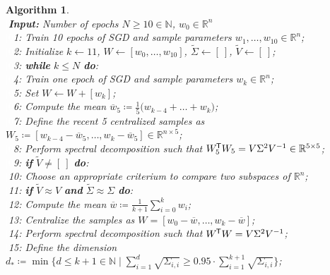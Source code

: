 \documentclass[11pt, a4paper]{article}
\newtheorem{algorithm}[theorem]{Algorithm}
\newcommand{\N}{\mathbb{N}}
\newcommand{\R}{\mathbb{R}}
\newcommand*{\tr}{^{\mkern-1.5mu\mathsf{T}}}
\begin{document}
\begin{algorithm}
\caption{ Sketch of Future Algorithm \textcolor{white}{$\Big |$}} \ \\
\textcolor{white}{$\Big |$}\textbf{Input:} Number of epochs $N \geq 10 \in \N$, $w_0 \in \R^n$ \\
\textcolor{white}{$\Big |0$}1: Train 10 epochs of SGD and sample parameters $w_1, \dots, w_{10} \in \R^n$; \\
\textcolor{white}{$\Big |0$}2: Initialize $k \leftarrow 11$, $W \leftarrow [ w_0, \dots, w_{10} ]$, $\tilde{\Sigma} \leftarrow [ \ ]$, $\tilde{V} \leftarrow [ \ ]$; \\
\textcolor{white}{$\Big |0$}3: \textbf{while} $k\leq N$ \textbf{do}: \\
\textcolor{white}{$\Big |0$}4: \quad Train one epoch of SGD and sample parameters $w_k \in \R^n$; \\
\textcolor{white}{$\Big |0$}5: \quad Set $W \leftarrow W + [w_k]$; \\
\textcolor{white}{$\Big |0$}6: \quad Compute the mean $\overline{w}_5 \coloneq \frac{1}{5} \big ( w_{k-4} + \dots + w_k \big )$; \\
\textcolor{white}{$\Big |0$}7: \quad Define the recent 5 centralized samples as $W_5 \coloneq [w_{k-4} - \overline{w}_5, \dots, w_k - \overline{w}_5] \in \R^{n \times 5}$; \\
\textcolor{white}{$\Big |0$}8: \quad Perform spectral decomposition such that $W_5\tr W_5 = V\Sigma^2V^{-1} \in \R^{5 \times 5}$; \\
\textcolor{white}{$\Big |0$}9: \quad \textbf{if} $\tilde{V} \neq [ \ ]$ \textbf{do}: \\
\textcolor{white}{$\Big |$}10: \quad \quad Choose an appropriate criterium to compare two subspaces of $\R^n$; \\
\textcolor{white}{$\Big |$}11: \quad \quad \textbf{if} $\tilde{V} \approx V$ \textbf{and} $\tilde{\Sigma} \approx \Sigma$ \textbf{do}: \\
\textcolor{white}{$\Big |$}12: \quad \quad \quad Compute the mean $\overline{w} \coloneq \frac{1}{k+1} \sum_{i=0}^{k} w_i$; \\
\textcolor{white}{$\Big |$}13: \quad \quad \quad Centralize the samples as $W = [w_0-\overline{w}, \dots, w_k - \overline{w}]$; \\
\textcolor{white}{$\Big |$}14: \quad \quad \quad Perform spectral decomposition such that $W\tr W = V \Sigma^2 V^{-1}$;  \\
\textcolor{white}{$\Big |$}15: \quad \quad \quad Define the dimension $d_* \coloneq \min \big \{ d \leq k+1 \in \N \mid \sum_{i=1}^{d} \sqrt{\Sigma_{i,i}} \geq 0.95 \cdot \sum_{i=1}^{k+1} \sqrt{\Sigma_{i,i}} \big \}$; \\

\end{algorithm}
\end{document}
